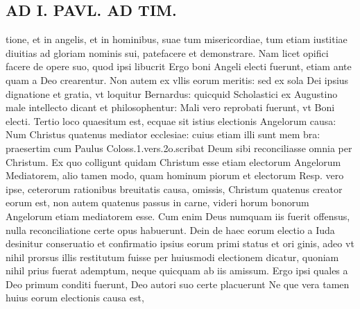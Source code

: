 \documentclass{article}
\begin{document}
\begin{pages}
\section*{AD I. PAVL. AD TIM. }
\marginpar{[ p.334 ]}\pstart tione, et in angelis, et in hominibus, suae tum misericordiae, tum etiam iustitiae diuitias ad gloriam nominis sui, patefacere et demonstrare. Nam licet opifici facere de opere suo, quod ipsi libucrit Ergo boni Angeli electi fuerunt, etiam ante quam a Deo crearentur. Non autem ex vllis eorum meritis: sed ex sola Dei ipsius dignatione et gratia, vt loquitur Bernardus: quicquid Scholastici ex Augustino male intellecto dicant et philosophentur: Mali vero reprobati fuerunt, vt Boni electi. Tertio loco quaesitum est, ecquae sit istius electionis Angelorum causa: Num Christus quatenus mediator ecclesiae: cuius etiam illi sunt mem bra: praesertim cum Paulus Coloss.1.vers.2o.scribat Deum sibi reconciliasse omnia per Christum. Ex quo colligunt quidam Christum esse etiam electorum Angelorum Mediatorem, alio tamen modo, quam hominum piorum et electorum Resp. vero ipse, ceterorum rationibus breuitatis causa, omissis, Christum quatenus creator eorum est, non autem quatenus passus in carne, videri horum bonorum Angelorum etiam mediatorem esse. Cum enim Deus numquam iis fuerit offensus, nulla reconciliatione certe opus habuerunt. Dein de haec eorum electio a Iuda desinitur conseruatio et confirmatio ipsius eorum primi status et ori ginis, adeo vt nihil prorsus illis restitutum fuisse per huiusmodi electionem dicatur, quoniam nihil prius fuerat ademptum, neque quicquam ab iis amissum. Ergo ipsi quales a Deo primum conditi fuerunt, Deo autori suo certe placuerunt Ne que vera tamen huius eorum electionis causa est,  \pend

\end{pages}
\end{document}
